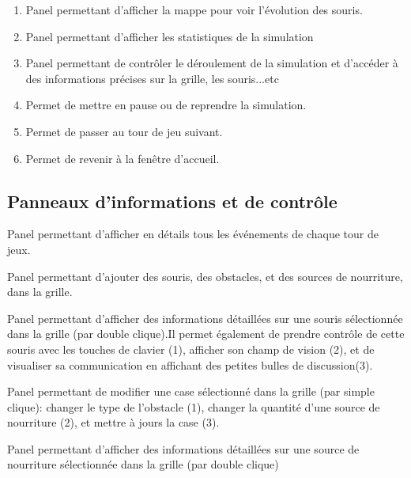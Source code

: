 \begin{enumerate}
\item Panel permettant d'afficher la mappe pour voir l'évolution des souris.
\item Panel permettant d'afficher les statistiques de la simulation
\item Panel permettant de contrôler le déroulement de la simulation et d’accéder à des informations précises sur la grille, les souris...etc
\item Permet de mettre en pause ou de reprendre la simulation. 
\item Permet de passer au tour de jeu suivant.
\item Permet de revenir à la fenêtre d'accueil.
\end{enumerate}

 
\subsection{Panneaux d'informations et de contrôle} 

Panel permettant d'afficher en détails tous les événements de chaque tour de jeux.


\clearpage
Panel permettant d'ajouter des souris, des obstacles, et des sources de nourriture, dans la grille.


Panel permettant d'afficher des informations détaillées sur une souris sélectionnée dans la grille (par double clique).Il permet également de prendre contrôle de cette souris avec les touches de clavier (1), afficher son champ de vision (2), et de visualiser sa communication en affichant des petites bulles de discussion(3).  


Panel permettant de modifier une case sélectionné dans la grille (par simple clique): changer le type de l'obstacle (1), changer la quantité d'une source de nourriture (2), et mettre à jours la case (3). 


\clearpage
Panel permettant d'afficher des informations détaillées sur une source de nourriture sélectionnée dans la grille (par double clique)

